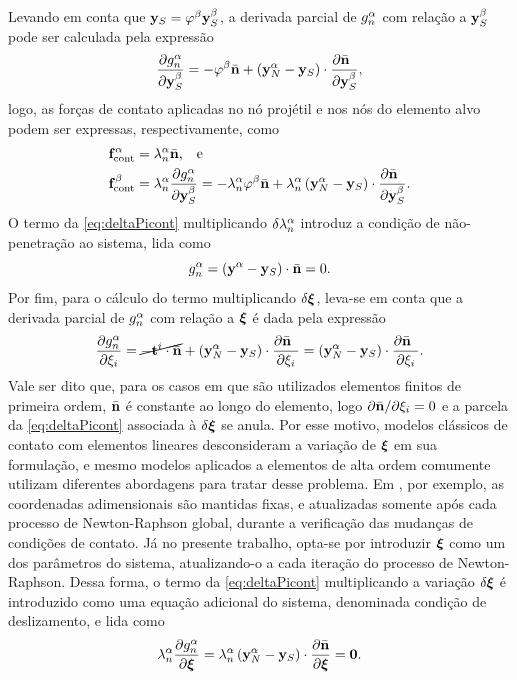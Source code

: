 \documentclass[Tese.tex]{subfiles}
\begin{document}
Levando em conta que $\mathbf{y}_S = \varphi^\beta\mathbf{y}_S^\beta$, a derivada parcial de $g_n^\alpha$ com relação a $\mathbf{y}_S^\beta$ pode ser calculada pela expressão
\begin{equation}
\dfrac{\partial g_n^\alpha}{\partial \mathbf{y}_S^\beta} = -\varphi^\beta\bar{\mathbf{n}} + \left(\mathbf{y}_N^\alpha-\mathbf{y}_S\right)\cdot\dfrac{\partial\bar{\mathbf{n}}_{\;\;}}{\partial\mathbf{y}_S^\beta},
\end{equation}
logo, as forças de contato aplicadas no nó projétil e nos nós do elemento alvo podem ser expressas, respectivamente, como
\begin{align}
&\mathbf{f}_\text{cont}^\alpha = \lambda_n^\alpha \bar{\mathbf{n}}  \text{,\quad e} \label{eq:fcontN}\\
&\mathbf{f}_\text{cont}^\beta = \lambda_n^\alpha\dfrac{\partial g_n^\alpha}{\partial \mathbf{y}_S^\beta} = - \lambda_n^\alpha \varphi^\beta\bar{\mathbf{n}} + \lambda_n^\alpha \left(\mathbf{y}_N^\alpha-\mathbf{y}_S\right)\cdot\dfrac{\partial\bar{\mathbf{n}}_{\;\;}}{\partial\mathbf{y}_S^\beta}. \label{eq:fcontS}
\end{align}
O termo da \cref{eq:deltaPicont} multiplicando $\delta\lambda_n^\alpha$ introduz a condição de não-penetração ao sistema, lida como
\begin{equation}
g_n^\alpha = \left(\mathbf{y}^\alpha-\mathbf{y}_S\right)\cdot\bar{\mathbf{n}} = 0. \label{eq:gN0}
\end{equation}
Por fim, para o cálculo do termo multiplicando $\delta\boldsymbol{\xi}$, leva-se em conta que a derivada parcial de $g_n^\alpha$ com relação a $\boldsymbol{\xi}$ é dada pela expressão
\begin{equation}
\dfrac{\partial g_n^\alpha}{\partial {\xi}_i} = \cancel{-\mathbf{t}^i\cdot\bar{\mathbf{n}}} + \left(\mathbf{y}_N^\alpha-\mathbf{y}_S\right)\cdot\dfrac{\partial\bar{\mathbf{n}}_{\;\;}}{\partial{\xi}_i} = \left(\mathbf{y}_N^\alpha-\mathbf{y}_S\right)\cdot\dfrac{\partial\bar{\mathbf{n}}_{\;\;}}{\partial{\xi}_i}.
\end{equation}
Vale ser dito que, para os casos em que são utilizados elementos finitos de primeira ordem, $\bar{\mathbf{n}}$ é constante ao longo do elemento, logo $\partial\bar{\mathbf{n}}/\partial{\xi}_i = 0$ e a parcela da \cref{eq:deltaPicont} associada à $\delta\boldsymbol{\xi}$ se anula. Por esse motivo, modelos clássicos de contato com elementos lineares desconsideram a variação de $\boldsymbol{\xi}$ em sua formulação, e mesmo modelos aplicados a elementos de alta ordem comumente utilizam diferentes abordagens para tratar desse problema. Em , por exemplo, as coordenadas adimensionais são mantidas fixas, e atualizadas somente após cada processo de Newton-Raphson global, durante a verificação das mudanças de condições de contato. Já no presente trabalho, opta-se por introduzir $\boldsymbol{\xi}$ como um dos parâmetros do sistema, atualizando-o a cada iteração do processo de Newton-Raphson. Dessa forma, o termo da \cref{eq:deltaPicont} multiplicando a variação $\delta\boldsymbol{\xi}$ é introduzido como uma equação adicional do sistema, denominada condição de deslizamento, e lida como
\begin{equation}\label{eq:deslizamento}
\lambda_n^\alpha\dfrac{\partial g_n^\alpha}{\partial \boldsymbol{\xi}} = \lambda_n^\alpha\left(\mathbf{y}_N^\alpha-\mathbf{y}_S\right)\cdot\dfrac{\partial\bar{\mathbf{n}}}{\partial\boldsymbol{\xi}} = \mathbf{0}.
\end{equation}
\end{document}
